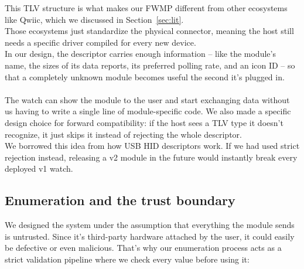 \documentclass[12pt, a4paper]{article}
\begin{document}
This TLV structure is what makes our FWMP different from other ecosystems like Qwiic, which we discussed in Section~\ref{sec:lit}. \\
Those ecosystems just standardize the physical connector, meaning the host still needs a specific driver compiled for every new device. \\
In our design, the descriptor carries enough information -- like the module's name, the sizes of its data reports, its preferred polling rate, and an icon ID -- so that a completely unknown module becomes useful the second it's plugged in. \\\\
The watch can show the module to the user and start exchanging data without us having to write a single line of module-specific code.
We also made a specific design choice for forward compatibility: if the host sees a TLV type it doesn't recognize, it just skips it instead of rejecting the whole descriptor. \\
We borrowed this idea from how USB HID descriptors work. If we had used strict rejection instead, releasing a v2 module in the future would instantly break every deployed v1 watch.


\subsection{Enumeration and the trust boundary}
\label{sec:fwmp:enum}

We designed the system under the assumption that everything the module sends is untrusted. Since it's third-party hardware attached by the user, it could easily be defective or even malicious. That's why our enumeration process acts as a strict validation pipeline where we check every value before using it:
\end{document}
